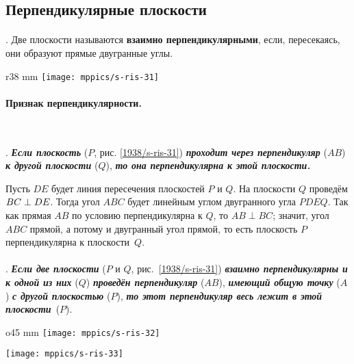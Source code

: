 \subsection*{Перпендикулярные плоскости}

\paragraph{}\label{1938/s42}
\mbox{.}
Две плоскости называются \textbf{взаимно перпендикулярными}, если, пересекаясь, они образуют прямые двугранные углы.

\begin{wrapfigure}{r}{38 mm}
\vskip-5mm
\centering
\texttt{[image: mppics/s-ris-31]}
\caption{}\label{1938/s-ris-31}
\end{wrapfigure}

\paragraph{Признак перпендикулярности.}\label{1938/s43}\ 

\mbox{.}
\textbf{\emph{Если плоскость}} ($P$, рис. \ref{1938/s-ris-31}) \textbf{\emph{проходит через перпендикуляр}} ($AB$) \textbf{\emph{к другой плоскости}} ($Q$), \textbf{\emph{то она перпендикулярна к этой плоскости.}}

Пусть $DE$ будет линия пересечения плоскостей $P$ и $Q$.
На плоскости $Q$ проведём $BC \z\perp DE$.
Тогда угол $ABC$ будет линейным углом двугранного угла $PDEQ$.
Так как прямая $AB$ по условию перпендикулярна к $Q$, то $AB\perp BC$;
значит, угол $ABC$ прямой, а потому и двугранный угол прямой, то есть плоскость $P$ перпендикулярна к плоскости~$Q$.

\paragraph{}\label{1938/s44}
.
\textbf{\emph{Если две плоскости}} ($P$ и $Q$, рис.~\ref{1938/s-ris-31}) \textbf{\emph{взаимно перпендикулярны и к одной из них}} ($Q$) \textbf{\emph{проведён перпендикуляр}} ($AB$), \textbf{\emph{имеющий общую точку}} ($A$) \textbf{\emph{с другой плоскостью}} ($P$), \textbf{\emph{то этот перпендикуляр весь лежит в этой плоскости}}~($P$).

\begin{wrapfigure}{o}{45 mm}
\centering
\texttt{[image: mppics/s-ris-32]}
\caption{}\label{1938/s-ris-32}
\bigskip
\texttt{[image: mppics/s-ris-33]}
\caption{}\label{1938/s-ris-33}
\end{wrapfigure}

